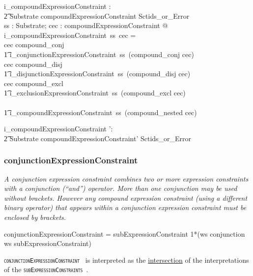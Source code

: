 \documentclass{article}
\def\spec#1{{\tt \small \textsc{{#1}} }}
\def\bnf#1{{\scriptsize {{#1}} }}
\def\desc#1{{\small \textsl{{#1}} }}
\begin{document}
\begin{axdef}
   i\_compoundExpressionConstraint : \\
\t2 Substrate \fun compoundExpressionConstraint \fun Sctids\_or\_Error \\
\where
  \forall ss : Substrate; cec : compoundExpressionConstraint @ \\
 i\_compoundExpressionConstraint~ss~cec = \\
   \IF cec \in \ran compound\_conj \THEN  \\
\t1 i\_conjunctionExpressionConstraint~ss~(compound\_conj \inv cec) \\
    \ELSE \IF cec \in \ran compound\_disj \THEN \\
\t1 i\_disjunctionExpressionConstraint~ss~(compound\_disj \inv cec) \\
    \ELSE \IF cec \in \ran compound\_excl \THEN \\
\t1 i\_exclusionExpressionConstraint~ss~(compound\_excl \inv cec) \\
   \ELSE \\
\t1 i\_compoundExpressionConstraint~ss~(compound\_nested \inv cec)
\end{axdef}
\begin{axdef}
   i\_compoundExpressionConstraint ': \\
\t2 Substrate \fun compoundExpressionConstraint' \fun Sctids\_or\_Error
\end{axdef}



\subsubsection{conjunctionExpressionConstraint}
\begin{framed}
\desc{A conjunction expression constraint combines two or more expression constraints with a conjunction (``and'') operator. More than one conjunction may be used without brackets. However any compound expression constraint (using a different binary operator) that appears within a conjunction expression constraint must be enclosed by brackets.}
\end{framed}

\begin{framed}
\noindent
\bnf{conjunctionExpressionConstraint = subExpressionConstraint 1*(ws conjunction ws subExpressionConstraint)}
\end{framed}

\spec{conjunctionExpressionConstraint} is interpreted as the \underline{intersection} of the interpretations of the
\spec{subExpressionConstraints}.
\end{document}
